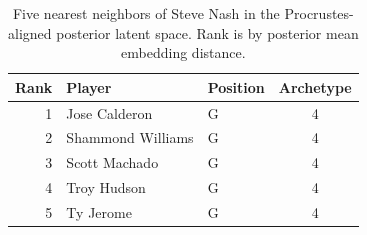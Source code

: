 \begin{table}[htbp]
  \centering\small
  \begin{tabular}{rllc}
    \toprule
    Rank & Player & Position & Archetype \\
    \midrule
    1 & Jose Calderon & G & 4 \\
    2 & Shammond Williams & G & 4 \\
    3 & Scott Machado & G & 4 \\
    4 & Troy Hudson & G & 4 \\
    5 & Ty Jerome & G & 4 \\
    \bottomrule
  \end{tabular}
  \caption{Five nearest neighbors of Steve Nash in the Procrustes-aligned posterior latent space. Rank is by posterior mean embedding distance.}
  \label{tab:Steve_Nash_neighbors}
\end{table}

